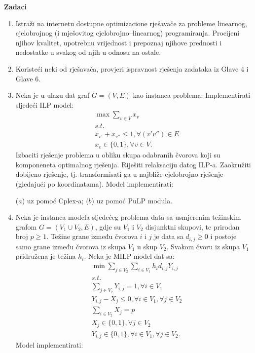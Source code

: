 \documentclass[a4paper, utf8, 11pt, colorlinks]{book}
\begin{document}
\textbf{\large Zadaci}
\begin{enumerate}
	\item Istraži na internetu dostupne optimizacione  rješavače za probleme linearnog, cjelobrojnog (i mješovitog cjelobrojno--linearnog) programiranja. Procijeni njihov kvalitet, upotrebnu vrijednost i prepoznaj njihove prednosti i nedostatke u svakog od njih u odnosu na ostale.
	
	\item Koristeći neki od rješavača, provjeri ispravnost rješenja zadataka iz Glave 4 i Glave 6.
	
	\item Neka je u ulazu dat graf  $G = (V, E)$ kao instanca problema. Implementirati sljedeći ILP model:
	\begin{align*}
		& \max \sum_{v \in V} x_v \\
		& s.t. \\
		& x_{v'} + x_{v''} \leq 1, \forall (v' v'')\in E \\
		& x_v \in \{0, 1 \}, \forall v \in  V.
	\end{align*}
Izbaciti rješenje problema u obliku skupa odabranih čvorova koji su komponeneta optimalnog rješenja. Riješiti relaksaciju datog ILP-a. Zaokružiti dobijeno rješenje, tj. transformisati ga u najbliže cjelobrojno rješenje (gledajući po koordinatama).  Model implementirati:

 ($a$) uz pomoć Cplex-a; ($b$) uz pomoć PuLP modula.
\item %
     Neka je instanca modela sljedećeg problema data sa usmjerenim težinskim grafom $G= (V_1 \cup V_2, E)$, gdje su $V_1$ i $V_2$ disjunktni skupovi, te prirodan broj $p\geq 1$. Težine grane između čvorova $i$ i $j$ je data sa $d_{i,j}\geq 0 $ i postoje samo grane između čvorova iz skupa $V_1$ u skup $V_2$. Svakom čvoru iz skupa $V_1$ pridružena je težina $h_{i}$. 
     Neka je MILP model dat  sa:
     \begin{align*}
     	 &\min \sum_{j \in V_2}\sum_{i \in V_1} h_i d_{i,j} Y_{i,j} \\
     	 &s.t. \\
     	 & \sum_{j \in V_2} Y_{i, j} = 1, \forall i \in V_1 \\
     	 & Y_{i,j} - X_j \leq 0, \forall i  \in V_1, \forall j \in V_2 \\     	 
     	 & \sum_{i \in V_2} X_j  = p \\
     	 & X_j \in \{0, 1\}, \forall j \in V_2 \\
     	 & Y_{i,j} \in \{0, 1\}, \forall i \in V_1, \forall j \in V_2.
     \end{align*}
      Model implementirati:
      

\end{enumerate}
\end{document}

